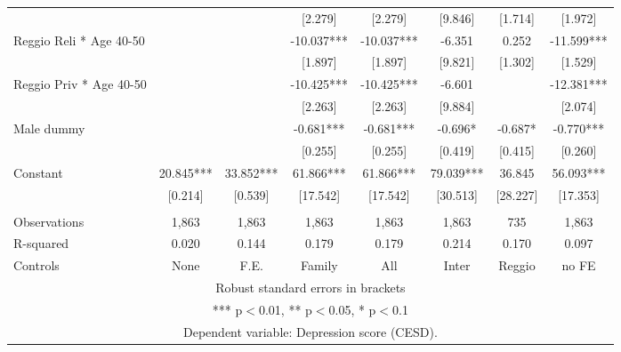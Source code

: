 \begin{tabular}{lccccccc}
 &  &  & [2.279] & [2.279] & [9.846] & [1.714] & [1.972] \\
Reggio Reli * Age 40-50 &  &  & -10.037*** & -10.037*** & -6.351 & 0.252 & -11.599*** \\
 &  &  & [1.897] & [1.897] & [9.821] & [1.302] & [1.529] \\
Reggio Priv * Age 40-50 &  &  & -10.425*** & -10.425*** & -6.601 &  & -12.381*** \\
 &  &  & [2.263] & [2.263] & [9.884] &  & [2.074] \\
Male dummy &  &  & -0.681*** & -0.681*** & -0.696* & -0.687* & -0.770*** \\
 &  &  & [0.255] & [0.255] & [0.419] & [0.415] & [0.260] \\
Constant & 20.845*** & 33.852*** & 61.866*** & 61.866*** & 79.039*** & 36.845 & 56.093*** \\
 & [0.214] & [0.539] & [17.542] & [17.542] & [30.513] & [28.227] & [17.353] \\
 &  &  &  &  &  &  &  \\
Observations & 1,863 & 1,863 & 1,863 & 1,863 & 1,863 & 735 & 1,863 \\
R-squared & 0.020 & 0.144 & 0.179 & 0.179 & 0.214 & 0.170 & 0.097 \\
 Controls & None & F.E. & Family & All & Inter & Reggio & no FE \\ \hline
\multicolumn{8}{c}{ Robust standard errors in brackets} \\
\multicolumn{8}{c}{ *** p$<$0.01, ** p$<$0.05, * p$<$0.1} \\
\multicolumn{8}{c}{ Dependent variable: Depression score (CESD).} \\
\end{tabular}
